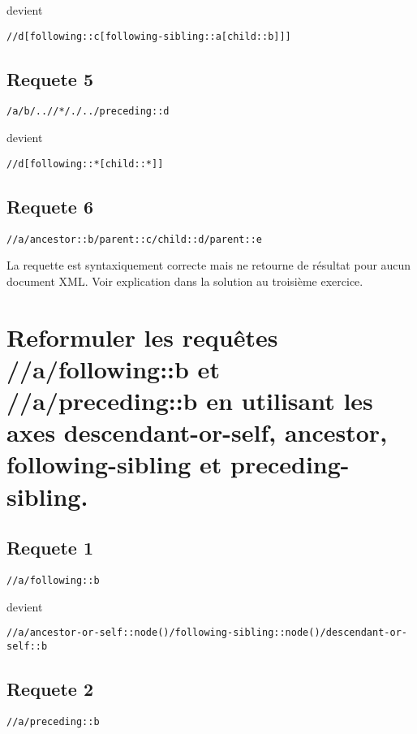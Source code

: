 devient

\begin{verbatim}
//d[following::c[following-sibling::a[child::b]]]
\end{verbatim}

\subsection{Requete 5}
\begin{verbatim}
/a/b/..//*/./../preceding::d
\end{verbatim}

devient

\begin{verbatim}
//d[following::*[child::*]]
\end{verbatim}

\subsection{Requete 6}
\begin{verbatim}
//a/ancestor::b/parent::c/child::d/parent::e
\end{verbatim}

La requette est syntaxiquement correcte mais ne retourne de résultat pour aucun document XML. Voir explication dans la solution au troisième exercice.

\section{Reformuler les requêtes //a/following::b et //a/preceding::b en utilisant les axes descendant-or-self, ancestor, following-sibling et preceding-sibling.}
\subsection{Requete 1}
\begin{verbatim}
//a/following::b
\end{verbatim}

devient

\begin{verbatim}
//a/ancestor-or-self::node()/following-sibling::node()/descendant-or-self::b
\end{verbatim}

\subsection{Requete 2}
\begin{verbatim}
//a/preceding::b
\end{verbatim}

